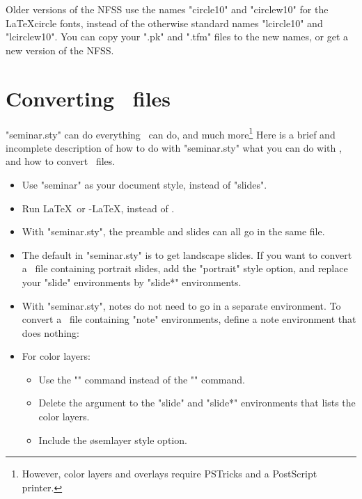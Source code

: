 \begin{slide}

Older versions of the NFSS use the names "circle10" and "circlew10" for the
\LaTeX circle fonts, instead of the otherwise standard names "lcircle10" and
"lcirclew10". You can copy your ".pk" and ".tfm" files to the new names, or
get a new version of the NFSS.

\section{Converting \SliTeX\ files}\label{slitex}

"seminar.sty" can do everything \SliTeX\ can do, and much
more\footnote{However, color layers and overlays require PSTricks and a
PostScript printer.} Here is a brief and incomplete description of how to do
with "seminar.sty" what you can do with \SliTeX, and how to convert \SliTeX\
files.

\begin{itemize}
  \item Use "seminar" as your document style, instead of "slides".

  \item Run \LaTeX\ or \AmS-\LaTeX, instead of \SliTeX.

  \item With "seminar.sty", the preamble and slides can all go in the same
file.

  \item The default in "seminar.sty" is to get landscape slides. If you want
to convert a \SliTeX\ file containing portrait slides, add the "portrait" 
style option, and replace your "slide" environments by "slide*" environments.

  \item With "seminar.sty", notes do not need to go in a separate environment.
To convert a \SliTeX\ file containing "note" environments, define a note
environment that does nothing:
\begin{LVerbatim}
  \newenvironment{note}{}{}
\end{LVerbatim}

  \item For color layers:
  \begin{itemize}
    \item Use the "" command instead of the "" command.
    \item Delete the argument to the "slide" and "slide*" environments that
lists the color layers.
    \item Include the \o{semlayer} style option.
  \end{itemize}


\end{itemize}
\end{slide}
